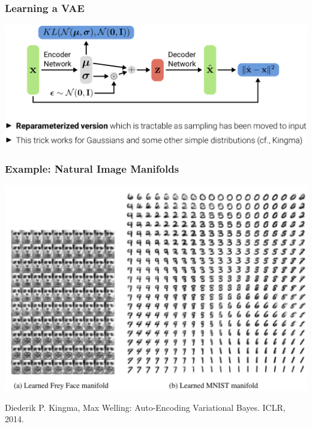 \documentclass[10pt,aspectratio=169]{beamer}
\begin{document}
\begin{frame}
  \frametitle{Learning a VAE}
\begin{center}
\includegraphics[width=.9\textwidth]{images/s44}
\end{center}
\end{frame}












\begin{frame}
  \frametitle{Example: Natural Image Manifolds}
\begin{center}
\includegraphics[width=.6\textwidth]{images/s8}
\end{center}
{\scriptsize{
Diederik P. Kingma, Max Welling: Auto-Encoding Variational Bayes. ICLR, 2014.
}}
\end{frame}
\end{document}
